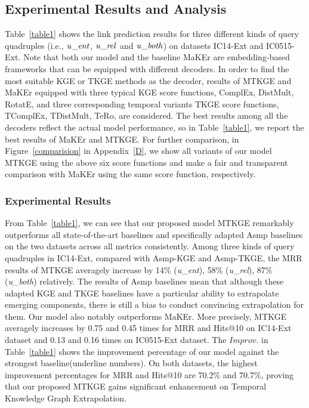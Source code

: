 \documentclass[sigconf]{acmart}
\begin{document}
\subsection{Experimental Results and Analysis}
\par
Table~\ref{table1} shows the link prediction results for three different kinds of query quadruples (i.e., $\text {\emph{u}\_\emph{ent}}$, $\text {\emph{u}\_\emph{rel}}$ and $\text {\emph{u}\_\emph{both}}$) on datasets IC14-Ext and IC0515-Ext.
Note that both our model and the baseline MaKEr are embedding-based frameworks that can be equipped with different decoders. In order to find the most suitable KGE or TKGE methods as the decoder, results of MTKGE and MaKEr equipped with three typical KGE score functions, ComplEx, DistMult, RotatE, and three corresponding temporal variants TKGE score functions, TComplEx, TDistMult, TeRo, are considered. The best results among all the decoders reflect the actual model performance, so in Table~\ref{table1}, we report the best results of MaKEr and MTKGE. 
For further comparison, in Figure~\ref{comparision} in Appendix~\ref{D}, we show all variants of our model MTKGE using the above six score functions and make a fair and transparent comparison with MaKEr \citep{MaKEr} using the same score function, respectively. 





\subsubsection{\textbf{Experimental Results}}

From Table~\ref{table1}, we can see that our proposed model MTKGE 
remarkably outperforms all state-of-the-art baselines and specifically adapted Asmp baselines on the two datasets across all metrics consistently. 
Among three kinds of query quadruples in IC14-Ext, compared with Asmp-KGE and Asmp-TKGE, the MRR results of MTKGE averagely increase by 14\% (\emph{u}\_\emph{ent}), 58\% (\emph{u}\_\emph{rel}), 87\% (\emph{u}\_\emph{both}) relatively. 
The results of Asmp baselines mean that although these adapted KGE and TKGE baselines have a particular ability to extrapolate emerging components, there is still a bias to conduct convincing extrapolation for them. 
Our model also notably outperforms MaKEr. More precisely, MTKGE averagely increases by 0.75 and 0.45 times for MRR and Hits@10 on IC14-Ext dataset and 0.13 and 0.16 times on IC0515-Ext dataset.
The $ {Improv.}$ in Table~\ref{table1} shows the improvement percentage of our model against the strongest baseline(underline numbers). On both datasets, the highest improvement percentages for MRR and Hits@10 are 70.2\% and 70.7\%, proving that our proposed MTKGE gains significant enhancement on Temporal Knowledge Graph Extrapolation. 
\end{document}
